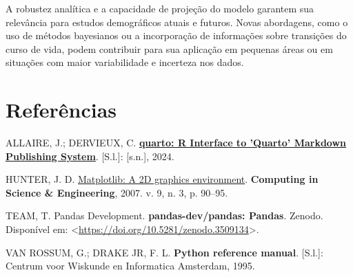 \documentclass[
  12pt,
  a4paper,
]{scrreprt}
\newlength{\cslhangindent}
\newenvironment{CSLReferences}[2] %
 {\begin{list}{}{%
  \setlength{\itemindent}{0pt}
  \setlength{\leftmargin}{0pt}
  \setlength{\parsep}{0pt}
  \ifodd #1
   \setlength{\leftmargin}{\cslhangindent}
   \setlength{\itemindent}{-1\cslhangindent}
  \fi
  \setlength{\itemsep}{#2\baselineskip}}}
 {\end{list}}
\begin{document}
\vspace{12pt}

A robustez analítica e a capacidade de projeção do modelo garantem sua
relevância para estudos demográficos atuais e futuros. Novas abordagens,
como o uso de métodos bayesianos ou a incorporação de informações sobre
transições do curso de vida, podem contribuir para sua aplicação em
pequenas áreas ou em situações com maior variabilidade e incerteza nos
dados.

\chapter*{\texorpdfstring{\centering Referências}{Referências}}\label{referuxeancias}


\label{refs}
\begin{CSLReferences}{0}{1}
ALLAIRE, J.; DERVIEUX, C.
\textbf{\href{https://CRAN.R-project.org/package=quarto}{quarto: R
Interface to 'Quarto' Markdown Publishing System}}. {[}S.l.{]}:
{[}s.n.{]}, 2024.

HUNTER, J. D. \href{https://doi.org/10.1109/MCSE.2007.55}{Matplotlib: A
2D graphics environment}. \textbf{Computing in Science \& Engineering},
2007. v. 9, n. 3, p. 90--95.

TEAM, T. Pandas Development. \textbf{pandas-dev/pandas: Pandas}. Zenodo.
Disponível em:
\textless{}\url{https://doi.org/10.5281/zenodo.3509134}\textgreater.

VAN ROSSUM, G.; DRAKE JR, F. L. \textbf{Python reference manual}.
{[}S.l.{]}: Centrum voor Wiskunde en Informatica Amsterdam, 1995.

\end{CSLReferences}
\end{document}
